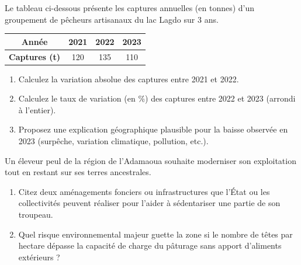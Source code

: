 \documentclass[11pt]{article}
\begin{document}
\begin{exercice}
Le tableau ci-dessous présente les captures annuelles (en tonnes) d'un groupement de pêcheurs artisanaux du lac Lagdo sur 3 ans.

\begin{tabular}{|c|c|c|c|}
\hline
\textbf{Année} & \textbf{2021} & \textbf{2022} & \textbf{2023} \\
\hline
\textbf{Captures (t)} & 120 & 135 & 110 \\
\hline
\end{tabular}

\begin{enumerate}
    \item Calculez la variation absolue des captures entre 2021 et 2022.
    \item Calculez le taux de variation (en \%) des captures entre 2022 et 2023 (arrondi à l'entier).
    \item Proposez une explication géographique plausible pour la baisse observée en 2023 (surpêche, variation climatique, pollution, etc.).
\end{enumerate}
\end{exercice}

\begin{exercice}
Un éleveur peul de la région de l'Adamaoua souhaite moderniser son exploitation tout en restant sur ses terres ancestrales.
\begin{enumerate}
    \item Citez deux aménagements fonciers ou infrastructures que l'État ou les collectivités peuvent réaliser pour l'aider à sédentariser une partie de son troupeau.
    \item Quel risque environnemental majeur guette la zone si le nombre de têtes par hectare dépasse la capacité de charge du pâturage sans apport d'aliments extérieurs ?
\end{enumerate}
\end{exercice}
\end{document}
